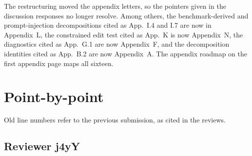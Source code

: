 \documentclass[11pt]{article}
\begin{document}
The restructuring moved the appendix letters, so the pointers given in the
discussion responses no longer resolve. Among others, the benchmark-derived
and prompt-injection decompositions cited as App.~I.4 and I.7 are now in
Appendix~L, the constrained edit test cited as App.~K is now Appendix~N, the
diagnostics cited as App.~G.1 are now Appendix~F, and the decomposition
identities cited as App.~B.2 are now Appendix~A. The appendix roadmap on the
first appendix page maps all sixteen.

\section{Point-by-point}

Old line numbers refer to the previous submission, as cited in the reviews.

\subsection*{Reviewer j4yY}
\end{document}
